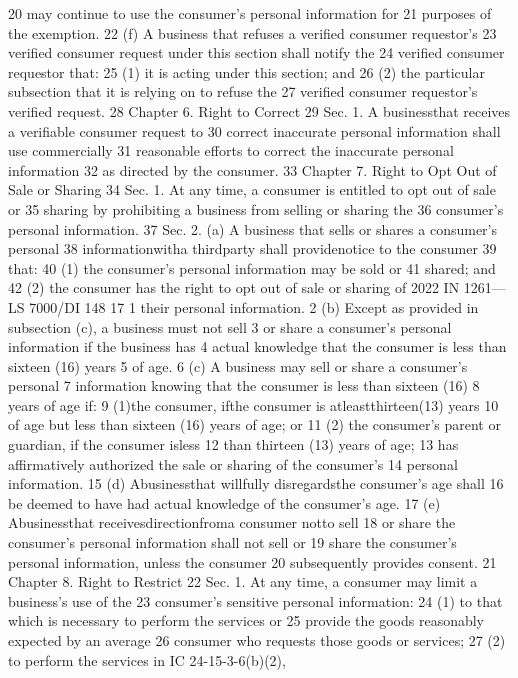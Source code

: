 20 may continue to use the consumer's personal information for
21 purposes of the exemption.
22 (f) A business that refuses a verified consumer requestor's
23 verified consumer request under this section shall notify the
24 verified consumer requestor that:
25 (1) it is acting under this section; and
26 (2) the particular subsection that it is relying on to refuse the
27 verified consumer requestor's verified request.
28 Chapter 6. Right to Correct
29 Sec. 1. A businessthat receives a verifiable consumer request to
30 correct inaccurate personal information shall use commercially
31 reasonable efforts to correct the inaccurate personal information
32 as directed by the consumer.
33 Chapter 7. Right to Opt Out of Sale or Sharing
34 Sec. 1. At any time, a consumer is entitled to opt out of sale or
35 sharing by prohibiting a business from selling or sharing the
36 consumer's personal information.
37 Sec. 2. (a) A business that sells or shares a consumer's personal
38 informationwitha thirdparty shall providenotice to the consumer
39 that:
40 (1) the consumer's personal information may be sold or
41 shared; and
42 (2) the consumer has the right to opt out of sale or sharing of
2022 IN 1261—LS 7000/DI 148
17
1 their personal information.
2 (b) Except as provided in subsection (c), a business must not sell
3 or share a consumer's personal information if the business has
4 actual knowledge that the consumer is less than sixteen (16) years
5 of age.
6 (c) A business may sell or share a consumer's personal
7 information knowing that the consumer is less than sixteen (16)
8 years of age if:
9 (1)the consumer, ifthe consumer is atleastthirteen(13) years
10 of age but less than sixteen (16) years of age; or
11 (2) the consumer's parent or guardian, if the consumer isless
12 than thirteen (13) years of age;
13 has affirmatively authorized the sale or sharing of the consumer's
14 personal information.
15 (d) Abusinessthat willfully disregardsthe consumer's age shall
16 be deemed to have had actual knowledge of the consumer's age.
17 (e) Abusinessthat receivesdirectionfroma consumer notto sell
18 or share the consumer's personal information shall not sell or
19 share the consumer's personal information, unless the consumer
20 subsequently provides consent.
21 Chapter 8. Right to Restrict
22 Sec. 1. At any time, a consumer may limit a business's use of the
23 consumer's sensitive personal information:
24 (1) to that which is necessary to perform the services or
25 provide the goods reasonably expected by an average
26 consumer who requests those goods or services;
27 (2) to perform the services in IC 24-15-3-6(b)(2),
